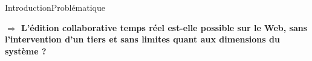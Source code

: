 \begin{frame}{Introduction}{Problématique}
\begin{minipage}{0.32\textwidth}
\begin{center}
\begin{tikzpicture}
      \end{tikzpicture}
    \end{center}
  \end{minipage}
  \begin{minipage}{0.32\textwidth}
    \begin{center}
    \end{center}
  \end{minipage}


  \vspace{0.5cm}

  \large\textbf{$\Rightarrow$ L'édition collaborative temps réel est-elle
    possible sur le Web, sans l'intervention d'un tiers et sans limites quant
    aux dimensions du système ?}

\end{frame}


